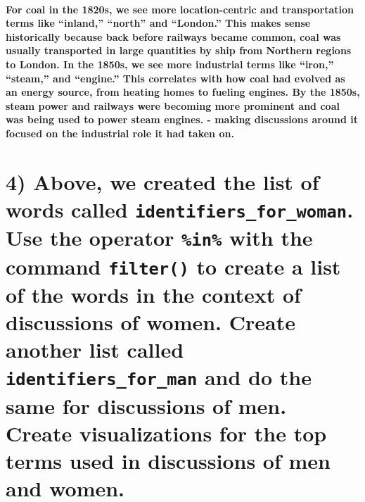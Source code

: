 \documentclass[
]{article}
\begin{document}
\paragraph{For coal in the 1820s, we see more location-centric and
transportation terms like ``inland,'' ``north'' and ``London.'' This
makes sense historically because back before railways became common,
coal was usually transported in large quantities by ship from Northern
regions to London. In the 1850s, we see more industrial terms like
``iron,'' ``steam,'' and ``engine.'' This correlates with how coal had
evolved as an energy source, from heating homes to fueling engines. By
the 1850s, steam power and railways were becoming more prominent and
coal was being used to power steam engines. - making discussions around
it focused on the industrial role it had taken
on.}\label{for-coal-in-the-1820s-we-see-more-location-centric-and-transportation-terms-like-inland-north-and-london.-this-makes-sense-historically-because-back-before-railways-became-common-coal-was-usually-transported-in-large-quantities-by-ship-from-northern-regions-to-london.-in-the-1850s-we-see-more-industrial-terms-like-iron-steam-and-engine.-this-correlates-with-how-coal-had-evolved-as-an-energy-source-from-heating-homes-to-fueling-engines.-by-the-1850s-steam-power-and-railways-were-becoming-more-prominent-and-coal-was-being-used-to-power-steam-engines.---making-discussions-around-it-focused-on-the-industrial-role-it-had-taken-on.}

\section{\texorpdfstring{4) Above, we created the list of words called
\texttt{identifiers\_for\_woman}. Use the operator \texttt{\%in\%} with
the command \texttt{filter()} to create a list of the words in the
context of discussions of women. Create another list called
\texttt{identifiers\_for\_man} and do the same for discussions of men.
Create visualizations for the top terms used in discussions of men and
women.}{4) Above, we created the list of words called identifiers\_for\_woman. Use the operator \%in\% with the command filter() to create a list of the words in the context of discussions of women. Create another list called identifiers\_for\_man and do the same for discussions of men. Create visualizations for the top terms used in discussions of men and women.}}\label{above-we-created-the-list-of-words-called-identifiers_for_woman.-use-the-operator-in-with-the-command-filter-to-create-a-list-of-the-words-in-the-context-of-discussions-of-women.-create-another-list-called-identifiers_for_man-and-do-the-same-for-discussions-of-men.-create-visualizations-for-the-top-terms-used-in-discussions-of-men-and-women.}
\end{document}
